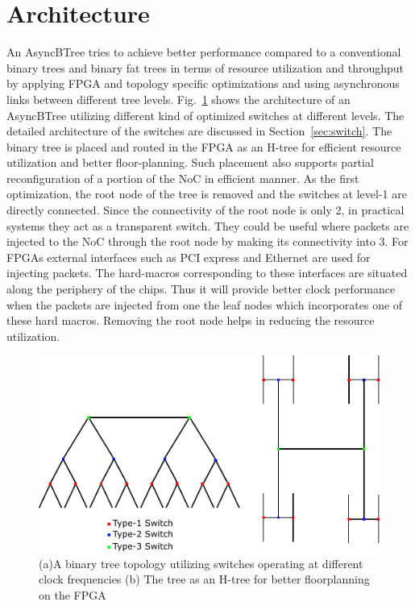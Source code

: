 \section{Architecture}
\label{sec:arch}

An AsyncBTree tries to achieve better performance compared to a conventional binary trees and binary fat trees in terms of resource utilization and throughput by applying FPGA and topology specific optimizations and using asynchronous links between different tree levels.
Fig.~\ref{fig:btree} shows the architecture of an AsyncBTree utilizing different kind of optimized switches at different levels.
The detailed architecture of the switches are discussed in Section~\ref{sec:switch}.
The binary tree is placed and routed in the FPGA as an H-tree for efficient resource utilization and better floor-planning.
Such placement also supports partial reconfiguration of a portion of the NoC in efficient manner.
As the first optimization, the root node of the tree is removed and the switches at level-1 are directly connected.
Since the connectivity of the root node is only 2, in practical systems they act as a transparent switch.
They could be useful where packets are injected to the NoC through the root node by making its connectivity into 3.
For FPGAs external interfaces such as PCI express and Ethernet are used for injecting packets.
The hard-macros corresponding to these interfaces are situated along the periphery of the chips.
Thus it will provide better clock performance when the packets are injected from one the leaf nodes which incorporates one of these hard macros.
Removing the root node helps in reducing the resource utilization.

\begin{figure}[t]
\centering
   \includegraphics[width=\columnwidth]{Figures/HNoC.pdf}
   \caption{(a)A binary tree topology utilizing switches operating at different clock frequencies (b) The tree as an H-tree for better floorplanning on the FPGA}
   \label{fig:btree}
\end{figure}

